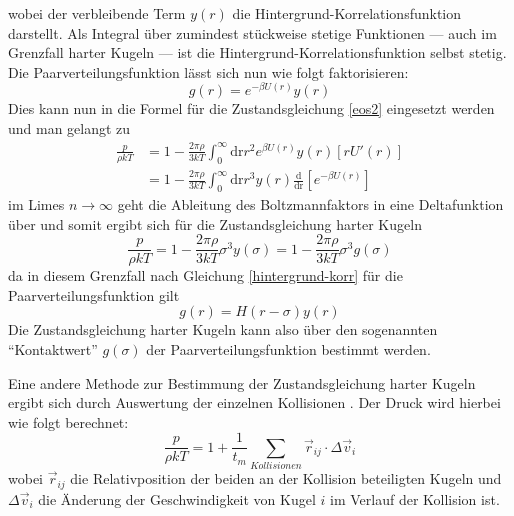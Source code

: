 wobei der verbleibende Term $y(r)$ die Hintergrund-Korrelationsfunktion darstellt. Als Integral über zumindest stückweise stetige Funktionen --- auch im Grenzfall harter Kugeln --- ist die Hintergrund-Korrelationsfunktion selbst stetig. Die Paarverteilungsfunktion lässt sich nun wie folgt faktorisieren:
\begin{equation}
g(r) = e^{-\beta U(r)} y(r)
\label{hintergrund-korr}
\end{equation}
Dies kann nun in die Formel für die Zustandsgleichung \ref{eos2} eingesetzt werden und man gelangt zu
\begin{align*}
\frac{p}{\rho k T} &= 1 - \frac{2\pi\rho}{3kT} \int_0^{\infty} \text{dr} r^2 e^{\beta U(r)} y(r) \left[ r U'(r) \right] \\ 
&= 1 - \frac{2\pi\rho}{3kT} \int_0^{\infty} \text{dr} r^3 y(r) \frac{\text{d}}{\text{dr}} \left[ e^{-\beta U(r)} \right]
\end{align*}
im Limes $n \rightarrow \infty$ geht die Ableitung des Boltzmannfaktors in eine Deltafunktion über und somit ergibt sich für die Zustandsgleichung harter Kugeln
\begin{equation}
\frac{p}{\rho k T} = 1 - \frac{2\pi\rho}{3kT} \sigma^3 y(\sigma) = 1 - \frac{2\pi\rho}{3kT} \sigma^3 g(\sigma)
\end{equation} 
da in diesem Grenzfall nach Gleichung \ref{hintergrund-korr} für die Paarverteilungsfunktion gilt
\begin{equation}
g(r) = H(r-\sigma)y(r) 
\end{equation}  
Die Zustandsgleichung harter Kugeln kann also über den sogenannten "`Kontaktwert"' $g(\sigma)$ der Paarverteilungsfunktion bestimmt werden. 

Eine andere Methode zur Bestimmung der Zustandsgleichung harter Kugeln ergibt sich durch Auswertung der einzelnen Kollisionen \cite{Erpenbeck1977}. Der Druck wird hierbei wie folgt berechnet: 
\begin{equation}
\frac{p}{\rho k T} = 1 + \frac{1}{t_m} \sum_{Kollisionen} \vec{r}_{ij} \cdot \Delta \vec{v}_i
\end{equation}
wobei $\vec{r}_{ij}$ die Relativposition der beiden an der Kollision beteiligten Kugeln und $\Delta \vec{v}_i$ die Änderung der Geschwindigkeit von Kugel $i$ im Verlauf der Kollision ist.
   
